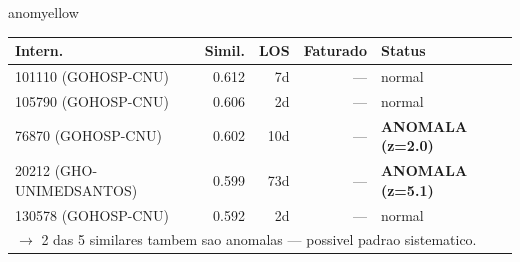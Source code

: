 \documentclass[a4paper,10pt]{article}
\begin{document}
\begin{anomalycard}[Internacao 166024 | GHO-PETROBRAS | MODERADO (z=2.03)]{anomyellow}
\begin{tabular}{l r r r l}\toprule\textbf{Intern.} & \textbf{Simil.} & \textbf{LOS} & \textbf{Faturado} & \textbf{Status} \\\midrule
101110 (GOHOSP-CNU) & 0.612 & 7d & --- & \textcolor{jcubeblue}{normal} \\
105790 (GOHOSP-CNU) & 0.606 & 2d & --- & \textcolor{jcubeblue}{normal} \\
76870 (GOHOSP-CNU) & 0.602 & 10d & --- & \textcolor{anomred}{\textbf{ANOMALA (z=2.0)}} \\
20212 (GHO-UNIMEDSANTOS) & 0.599 & 73d & --- & \textcolor{anomred}{\textbf{ANOMALA (z=5.1)}} \\
130578 (GOHOSP-CNU) & 0.592 & 2d & --- & \textcolor{jcubeblue}{normal} \\
\multicolumn{5}{l}{\textcolor{anomred}{\small $\rightarrow$ 2 das 5 similares tambem sao anomalas --- possivel padrao sistematico.}} \\
\bottomrule\end{tabular}


\end{anomalycard}

\newpage
\end{document}
